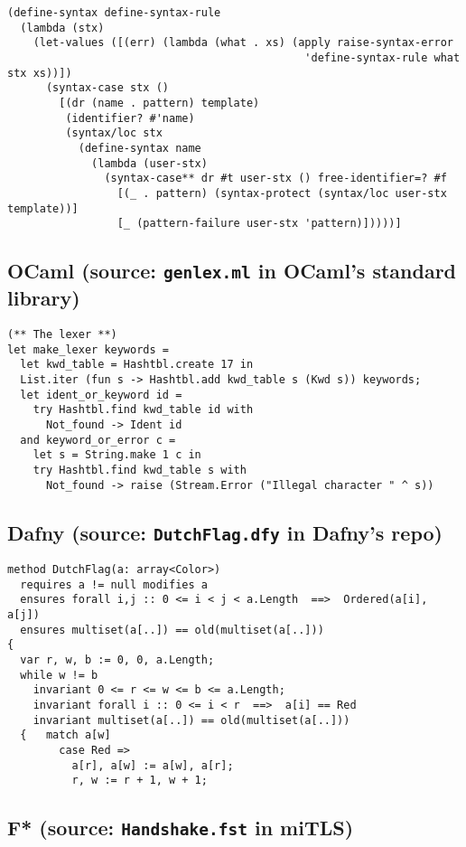 \documentclass{article}
\begin{document}
\begin{verbatim}
(define-syntax define-syntax-rule
  (lambda (stx)
    (let-values ([(err) (lambda (what . xs) (apply raise-syntax-error
                                              'define-syntax-rule what stx xs))])
      (syntax-case stx ()
        [(dr (name . pattern) template)
         (identifier? #'name)
         (syntax/loc stx
           (define-syntax name
             (lambda (user-stx)
               (syntax-case** dr #t user-stx () free-identifier=? #f
                 [(_ . pattern) (syntax-protect (syntax/loc user-stx template))]
                 [_ (pattern-failure user-stx 'pattern)]))))]
\end{verbatim}

\subsection*{OCaml (source: \texttt{genlex.ml} in OCaml's standard library)}

\begin{verbatim}
(** The lexer **)
let make_lexer keywords =
  let kwd_table = Hashtbl.create 17 in
  List.iter (fun s -> Hashtbl.add kwd_table s (Kwd s)) keywords;
  let ident_or_keyword id =
    try Hashtbl.find kwd_table id with
      Not_found -> Ident id
  and keyword_or_error c =
    let s = String.make 1 c in
    try Hashtbl.find kwd_table s with
      Not_found -> raise (Stream.Error ("Illegal character " ^ s))
\end{verbatim}

\subsection*{Dafny (source: \texttt{DutchFlag.dfy} in Dafny's repo)}

\begin{verbatim}
method DutchFlag(a: array<Color>)
  requires a != null modifies a
  ensures forall i,j :: 0 <= i < j < a.Length  ==>  Ordered(a[i], a[j])
  ensures multiset(a[..]) == old(multiset(a[..]))
{
  var r, w, b := 0, 0, a.Length;
  while w != b
    invariant 0 <= r <= w <= b <= a.Length;
    invariant forall i :: 0 <= i < r  ==>  a[i] == Red
    invariant multiset(a[..]) == old(multiset(a[..]))
  {   match a[w]
        case Red =>
          a[r], a[w] := a[w], a[r];
          r, w := r + 1, w + 1;
\end{verbatim}

\subsection*{F* (source: \texttt{Handshake.fst} in miTLS)}
\end{document}
